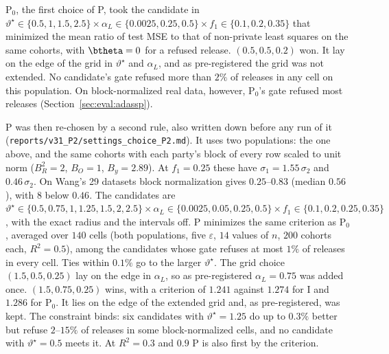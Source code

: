   \item P$_0$, the first choice of P, took the candidate in $\vartheta^\star \in \{0.5, 1, 1.5, 2.5\} \times \alpha_L \in \{0.0025, 0.25, 0.5\} \times f_1 \in \{0.1, 0.2, 0.35\}$ that minimized the mean ratio of test MSE to that of non-private least squares on the same cohorts, with $\btheta = 0$ for a refused release. $(0.5, 0.5, 0.2)$ won. It lay on the edge of the grid in $\vartheta^\star$ and $\alpha_L$, and as pre-registered the grid was not extended. No candidate's gate refused more than $2\%$ of releases in any cell on this population. On block-normalized real data, however, P$_0$'s gate refused most releases (Section~\ref{sec:eval:adassp}).
  \item P was then re-chosen by a second rule, also written down before any run of it (\nolinkurl{reports/v31_P2/settings_choice_P2.md}). It uses two populations: the one above, and the same cohorts with each party's block of every row scaled to unit norm ($B_R^2 = 2$, $B_O = 1$, $B_y = 2.89$). At $f_1 = 0.25$ these have $\sigma_1 = 1.55\,\sigma_2$ and $0.46\,\sigma_2$. On Wang's 29 datasets block normalization gives $0.25$--$0.83$ (median $0.56$), with 8 below $0.46$. The candidates are $\vartheta^\star \in \{0.5, 0.75, 1, 1.25, 1.5, 2, 2.5\} \times \alpha_L \in \{0.0025, 0.05, 0.25, 0.5\} \times f_1 \in \{0.1, 0.2, 0.25, 0.35\}$, with the exact radius and the intervals off. P minimizes the same criterion as P$_0$, averaged over $140$ cells (both populations, five $\varepsilon$, $14$ values of $n$, $200$ cohorts each, $R^2 = 0.5$), among the candidates whose gate refuses at most $1\%$ of releases in every cell. Ties within $0.1\%$ go to the larger $\vartheta^\star$. The grid choice $(1.5, 0.5, 0.25)$ lay on the edge in $\alpha_L$, so as pre-registered $\alpha_L = 0.75$ was added once. $(1.5, 0.75, 0.25)$ wins, with a criterion of $1.241$ against $1.274$ for I and $1.286$ for P$_0$. It lies on the edge of the extended grid and, as pre-registered, was kept. The constraint binds: six candidates with $\vartheta^\star = 1.25$ do up to $0.3\%$ better but refuse $2$--$15\%$ of releases in some block-normalized cells, and no candidate with $\vartheta^\star = 0.5$ meets it. At $R^2 = 0.3$ and $0.9$ P is also first by the criterion.

